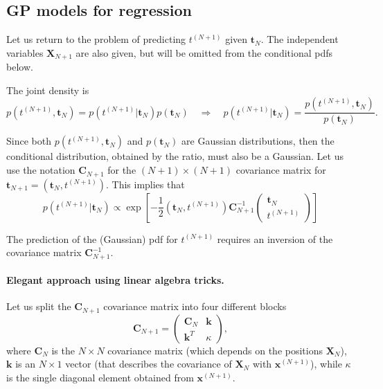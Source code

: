 \documentclass[%
oneside,                 %
final,                   %
10pt]{article}
\newenvironment{summary_mdfboxadmon}[1][]{
\begin{summary_mdfboxmdframed}[frametitle=#1]
}
{
\end{summary_mdfboxmdframed}
}
\begin{document}
\subsection{GP models for regression}
Let us return to the problem of predicting $t^{(N+1)}$ given $\boldsymbol{t}_N$. The independent variables $\boldsymbol{X}_{N+1}$ are also given, but will be omitted from the conditional pdfs below.

The joint density is
\[
p \left( t^{(N+1)}, \boldsymbol{t}_N \right) = p \left( t^{(N+1)} | \boldsymbol{t}_N \right) p \left( \boldsymbol{t}_N \right) 
\quad \Rightarrow \quad
p \left( t^{(N+1)} | \boldsymbol{t}_N \right) = \frac{p \left( t^{(N+1)}, \boldsymbol{t}_N \right)}{p \left( \boldsymbol{t}_N \right) }.
\]

Since both $p \left( t^{(N+1)}, \boldsymbol{t}_N \right)$ and $p \left( \boldsymbol{t}_N \right)$ are Gaussian distributions, then the conditional distribution, obtained by the ratio, must also be a Gaussian. Let us use the notation $\boldsymbol{C}_{N+1}$ for the $(N+1) \times (N+1)$ covariance matrix for $\boldsymbol{t}_{N+1} = \left( \boldsymbol{t}_N, t^{(N+1)} \right)$. This implies that
\[
p \left( t^{(N+1)} | \boldsymbol{t}_N \right) \propto \exp \left[ -\frac{1}{2} \left( \boldsymbol{t}_N, t^{(N+1)} \right) \boldsymbol{C}_{N+1}^{-1} 
\begin{pmatrix}
\boldsymbol{t}_N \\
t^{(N+1)}
\end{pmatrix}
\right]
\]


\begin{summary_mdfboxadmon}[Summary]
The prediction of the (Gaussian) pdf for $t^{(N+1)}$ requires an inversion of the covariance matrix $\boldsymbol{C}_{N+1}^{-1}$.
\end{summary_mdfboxadmon} %



\paragraph{Elegant approach using linear algebra tricks.}
Let us split the $\boldsymbol{C}_{N+1}$ covariance matrix into four different blocks
\[
\boldsymbol{C}_{N+1} =
\begin{pmatrix}
\boldsymbol{C}_N & \boldsymbol{k} \\
\boldsymbol{k}^T & \kappa
\end{pmatrix},
\]
where $\boldsymbol{C}_N$ is the $N \times N$ covariance matrix (which depends on the positions $\boldsymbol{X}_N$), $\boldsymbol{k}$ is an $N \times 1$ vector (that describes the covariance of $\boldsymbol{X}_N$ with $\boldsymbol{x}^{(N+1)}$), while $\kappa$ is the single diagonal element obtained from $\boldsymbol{x}^{(N+1)}$.
\end{document}
